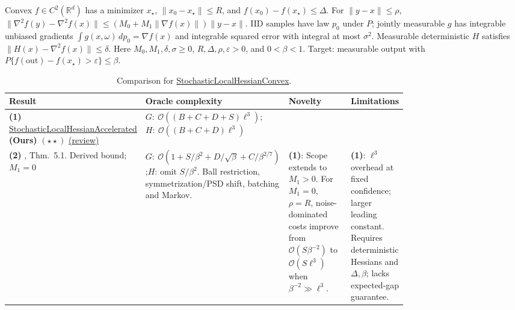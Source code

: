 \begin{table}[tp]
\centering
\caption{Comparison for \href{https://github.com/k3nfalt/longtails/blob/main/LongTails/Setups/StochasticLocalHessianConvex.lean}{StochasticLocalHessianConvex}.}\label{tab:StochasticLocalHessianConvex}
\parbox{\linewidth}{\footnotesize Convex $f\in C^2(\mathbb R^d)$ has a minimizer $x_\star$, $\|x_0-x_\star\|\le R$, and $f(x_0)-f(x_\star)\le\Delta$. For $\|y-x\|\le\rho$, $\|\nabla^2f(y)-\nabla^2f(x)\|\le(M_0+M_1\|\nabla f(x)\|)\|y-x\|$. IID samples have law $p_0$ under $P$; jointly measurable $g$ has integrable unbiased gradients $\int g(x,\omega)\,dp_0=\nabla f(x)$ and integrable squared error with integral at most $\sigma^2$. Measurable deterministic $H$ satisfies $\|H(x)-\nabla^2f(x)\|\le\delta$. Here $M_0,M_1,\delta,\sigma\ge0$, $R,\Delta,\rho,\varepsilon>0$, and $0<\beta<1$. Target: measurable output with $P\{f(\mathrm{out})-f(x_\star)>\varepsilon\}\le\beta$.}\par\smallskip
\begin{threeparttable}
\footnotesize
\setlength{\tabcolsep}{4pt}\renewcommand{\arraystretch}{1.25}
\begin{tabularx}{\linewidth}{@{}>{\raggedright\arraybackslash}p{0.20\linewidth}>{\raggedright\arraybackslash}p{0.32\linewidth}>{\raggedright\arraybackslash}p{0.25\linewidth}>{\raggedright\arraybackslash}X@{}}
\toprule
\textbf{Result} & \textbf{Oracle complexity} & \textbf{Novelty} & \textbf{Limitations} \\
\midrule
\textbf{(1)} \href{https://github.com/k3nfalt/longtails/blob/main/LongTails/Theorems/StochasticLocalHessianAccelerated.lean}{Stochastic\allowbreak Local\allowbreak Hessian\allowbreak Accelerated} \textbf{(Ours)} $(\star\star)$ \href{https://github.com/k3nfalt/longtails/blob/main/scripts/reviews/StochasticLocalHessianAccelerated.md}{(review)} &
$G:\ \mathcal{O}((B+C+D+S)\ell^3)$;\newline $H:\ \mathcal{O}((B+C+D)\ell^3)$ & & \\
\midrule[1.2pt]
\textbf{(2)} \citep{slhcContractingV2}, Thm.~5.1. Derived bound; $M_1=0$ &
$G:\ \mathcal{O}(1+S/\beta^2+D/\sqrt\beta+C/\beta^{2/7})$;\newline $H$: omit $S/\beta^2$. Ball restriction, symmetrization/PSD shift, batching and Markov. &
\textbf{(1)}: Scope extends to $M_1>0$. For $M_1=0$, $\rho=R$, noise-dominated costs improve from $\mathcal{O}(S\beta^{-2})$ to $\mathcal{O}(S\ell^3)$ when $\beta^{-2}\gg\ell^3$. &
\textbf{(1)}: $\ell^3$ overhead at fixed confidence; larger leading constant. Requires deterministic Hessians and $\Delta,\beta$; lacks expected-gap guarantee. \\

\end{tabularx}
\end{threeparttable}
\end{table}
